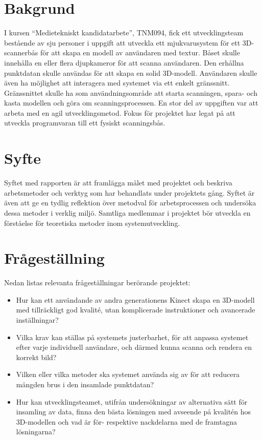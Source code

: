 \documentclass[a4paper,12pt,oneside,final]{extbook}
\begin{document}
\section{Bakgrund}
I kursen “Medietekniskt kandidatarbete”, TNM094, fick ett utvecklingsteam bestående av sju personer i uppgift att utveckla ett mjukvarusystem för ett 3D-scannerbås för att skapa en modell av användaren med textur. Båset skulle innehålla en eller flera djupkameror för att scanna användaren. Den erhållna punktdatan skulle användas för att skapa en solid 3D-modell. Användaren skulle även ha möjlighet att interagera med systemet via ett enkelt gränssnitt. Gränssnittet skulle ha som användningsområde att starta scanningen, spara- och kasta modellen och göra om scanningsprocessen. En stor del av uppgiften var att arbeta med en agil utvecklingsmetod. Fokus för projektet har legat på att utveckla programvaran till ett fysiskt scanningsbås.

\section{Syfte}
Syftet med rapporten är att framlägga målet med projektet och beskriva arbetsmetoder och verktyg som har behandlats under projektets gång. Syftet är även att ge en tydlig reflektion över metodval för arbetsprocessen och undersöka dessa metoder i verklig miljö. Samtliga medlemmar i projektet bör utveckla en förståelse för teoretiska metoder inom systemutveckling.

\section{Frågeställning}

Nedan listas relevanta frågeställningar berörande projektet:
\begin{itemize}

\item Hur kan ett användande av andra generationens Kinect skapa en 3D-modell med tillräckligt god kvalité, utan komplicerade instruktioner och avancerade inställningar?
\item Vilka krav kan ställas på systemets justerbarhet, för att anpassa systemet efter varje individuell användare, och därmed kunna scanna och rendera en korrekt bild?
\item Vilken eller vilka metoder ska systemet använda sig av för att reducera mängden brus i den insamlade punktdatan?
\item Hur kan utvecklingsteamet, utifrån undersökningar av alternativa sätt för insamling av data, finna den bästa lösningen med avseende på kvalitén hos 3D-modellen och vad är för- respektive nackdelarna med de framtagna lösningarna?

\end{itemize}
\end{document}
